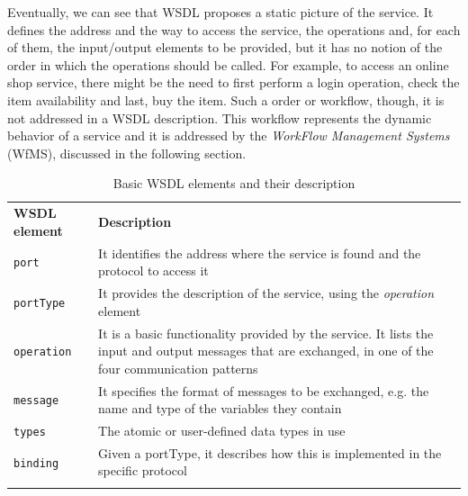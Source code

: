 Eventually, we can see that WSDL proposes a static picture of the service. It defines the address and the way to access the service, the operations and, for each of them, the input/output elements to be provided, but it has no notion of the order in which the operations should be called. For example, to access an online shop service, there might be the need to first perform a login operation, check the item availability and last, buy the item. Such a order or workflow, though, it is not addressed in a WSDL description. This workflow represents the dynamic behavior of a service and it is addressed by the \textit{WorkFlow Management Systems} (WfMS), discussed in the following section.


% 
\begin{table}
\begin{center}
\begin{tabular}{l p{11cm}}

						\toprule
						\addlinespace[0.2cm]
\textbf{WSDL element} 	& \textbf{Description}	\\ 
						\cmidrule(l){1-2}
\verb|port| 		& It identifies the address where the service is found and the protocol to access it 				\\[0,1cm]
\verb|portType| 	& It provides the description of the service, using the \textit{operation} element 				\\[0,1cm]
\verb|operation| 	& It is a basic functionality provided by the service. It lists the input and output messages that are exchanged, in one of the four communication patterns 														\\[0,1cm]
\verb|message| 		& It specifies the format of messages to be exchanged, e.g. the name and type of the variables they contain 	\\[0,1cm]
\verb|types|		& The atomic or user-defined data types in use  								\\[0,1cm]
\verb|binding|		& Given a portType, it describes how this is implemented in the specific protocol 				\\[0,1cm]
	 
						\addlinespace[0.2cm]
						\bottomrule
\end{tabular}
\end{center}
\caption{Basic WSDL elements and their description}
\label{tab:WSDLElements}
\end{table}


